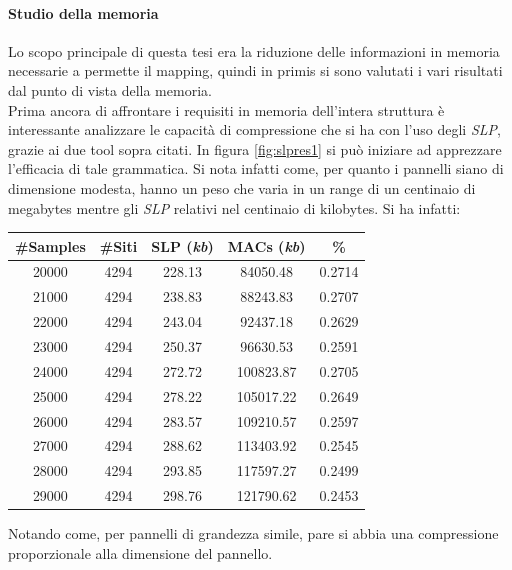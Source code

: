 \paragraph{Studio della memoria}
Lo scopo principale di questa tesi era la riduzione delle informazioni in
memoria necessarie a permette il mapping, quindi in primis si sono valutati i
vari risultati dal punto di vista della memoria.\\
Prima ancora di affrontare i requisiti
in memoria dell'intera struttura è interessante analizzare le capacità di
compressione che si ha con l'uso degli \textit{SLP}, grazie ai due tool sopra
citati. In figura \ref{fig:slpres1} si può iniziare ad apprezzare l'efficacia di
tale grammatica. Si nota infatti come, per quanto i pannelli siano di dimensione
modesta, hanno un peso che varia in un range di un centinaio di megabytes mentre
gli \textit{SLP} relativi nel centinaio di kilobytes. Si ha infatti:
\begin{table}[H]
  \centering
  \begin{tabular}{c|c|c|c|c}
    \textbf{\#Samples} & \textbf{\#Siti} & \textbf{SLP (\textit{kb})}
    & \textbf{MACs (\textit{kb})} & \textbf{\%}\\
    \hline
    20000 & 4294 & 228.13 & 84050.48 & 0.2714\\
    21000 & 4294 & 238.83 & 88243.83 & 0.2707\\
    22000 & 4294 & 243.04 & 92437.18 & 0.2629\\
    23000 & 4294 & 250.37 & 96630.53 & 0.2591\\
    24000 & 4294 & 272.72 & 100823.87 & 0.2705\\
    25000 & 4294 & 278.22 & 105017.22 & 0.2649\\
    26000 & 4294 & 283.57 & 109210.57 & 0.2597\\
    27000 & 4294 & 288.62 & 113403.92 & 0.2545\\
    28000 & 4294 & 293.85 & 117597.27 & 0.2499\\
    29000 & 4294 & 298.76 & 121790.62 & 0.2453\\
  \end{tabular}
\end{table}
Notando come, per pannelli di grandezza simile, pare si abbia una compressione
proporzionale alla dimensione del pannello.\\
